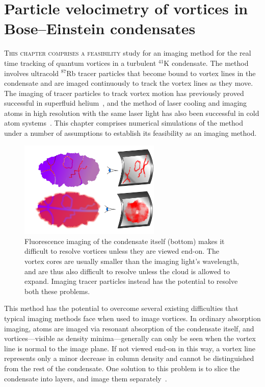 
\chapter{Particle velocimetry of vortices in Bose–Einstein condensates}\label{chap:velocimetry}

\lettrine[lines=3]{T}{his chapter comprises a feasibility} study for an imaging method for the real time tracking of quantum vortices in a turbulent $^{41}$K condensate. The method involves ultracold $^{87}$Rb tracer particles that become bound to vortex lines in the condensate and are imaged continuously to track the vortex lines as they move. The imaging of tracer particles to track vortex motion has previously proved successful in superfluid helium~\cite{bewley_generation_2009, bewley_superfluid_2006, packard_vortex_1982}, and the method of laser cooling and imaging atoms in high resolution with the same laser light has also been successful in cold atom systems~\cite{bakr_quantum_2009}. This chapter comprises numerical simulations of the method under a number of assumptions to establish its feasibility as an imaging method. 

\begin{figure}
\begin{center}
\includegraphics[width=0.6\textwidth]{figures/unsorted/side-on.pdf}
\caption{\label{fig:side-on}Fluorescence imaging of the condensate itself (bottom) makes it difficult to resolve vortices unless they are viewed end-on. The vortex cores are usually smaller than the imaging light's wavelength, and are thus also difficult to resolve unless the cloud is allowed to expand. Imaging tracer particles instead has the potential to resolve both these problems.}
\end{center}
\end{figure}

This method has the potential to overcome several existing difficulties that typical imaging methods face when used to image vortices. In ordinary absorption imaging, atoms are imaged via resonant absorption of the condensate itself, and vortices---visible as density minima---generally can only be seen when the vortex line is normal to the image plane. If not viewed end-on in this way, a vortex line represents only a minor decrease in column density and cannot be distinguished from the rest of the condensate. One solution to this problem is to slice the condensate into layers, and image them separately~\cite{anderson_watching_2001}.

